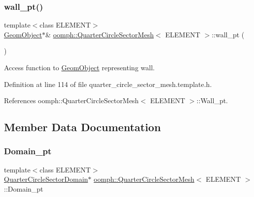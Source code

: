 \mbox{\label{classoomph_1_1QuarterCircleSectorMesh_a0b03071bbe7e95cc6723c221ddc0998a}} 
\subsubsection{\texorpdfstring{wall\+\_\+pt()}{wall\_pt()}}
{\footnotesize\ttfamily template$<$class E\+L\+E\+M\+E\+NT$>$ \\
\hyperlink{classoomph_1_1GeomObject}{Geom\+Object}$\ast$\& \hyperlink{classoomph_1_1QuarterCircleSectorMesh}{oomph\+::\+Quarter\+Circle\+Sector\+Mesh}$<$ E\+L\+E\+M\+E\+NT $>$\+::wall\+\_\+pt (\begin{DoxyParamCaption}{ }\end{DoxyParamCaption})\hspace{0.3cm}{\ttfamily [inline]}}



Access function to \hyperlink{classoomph_1_1GeomObject}{Geom\+Object} representing wall. 



Definition at line 114 of file quarter\+\_\+circle\+\_\+sector\+\_\+mesh.\+template.\+h.



References oomph\+::\+Quarter\+Circle\+Sector\+Mesh$<$ E\+L\+E\+M\+E\+N\+T $>$\+::\+Wall\+\_\+pt.



\subsection{Member Data Documentation}
\mbox{\label{classoomph_1_1QuarterCircleSectorMesh_a49e72c17a9409ec4a2b7a1ebf98fb4a1}} 
\subsubsection{\texorpdfstring{Domain\+\_\+pt}{Domain\_pt}}
{\footnotesize\ttfamily template$<$class E\+L\+E\+M\+E\+NT$>$ \\
\hyperlink{classoomph_1_1QuarterCircleSectorDomain}{Quarter\+Circle\+Sector\+Domain}$\ast$ \hyperlink{classoomph_1_1QuarterCircleSectorMesh}{oomph\+::\+Quarter\+Circle\+Sector\+Mesh}$<$ E\+L\+E\+M\+E\+NT $>$\+::Domain\+\_\+pt\hspace{0.3cm}{\ttfamily [protected]}}



